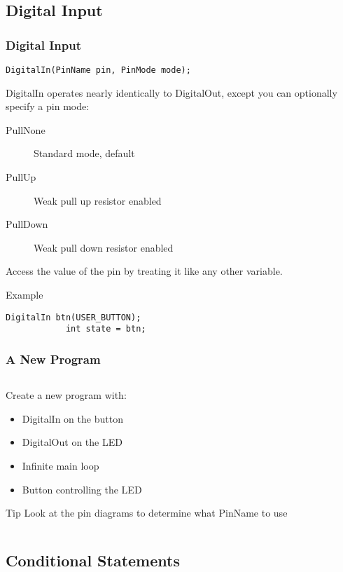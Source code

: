 \subsection{Digital Input}
\label{sub:digital_input}
\begin{frame}[fragile]
	\frametitle{Digital Input}
	\begin{lstlisting}[numbers=none]
		DigitalIn(PinName pin, PinMode mode);
	\end{lstlisting}
	DigitalIn operates nearly identically to DigitalOut, except you can optionally specify a pin mode:
	\begin{description}
		\item[PullNone] Standard mode, default
		\item[PullUp] Weak pull up resistor enabled
		\item[PullDown] Weak pull down resistor enabled
	\end{description}
	Access the value of the pin by treating it like any other variable.
	\begin{block}{Example}
		\begin{lstlisting}[numbers=none]
			DigitalIn btn(USER_BUTTON);
			int state = btn;
		\end{lstlisting}
	\end{block}
\end{frame}

\begin{frame}[fragile]
	\frametitle{A New Program}
	\begin{columns}[T]
		\begin{column}{0.5\textwidth}
			Create a new program with:
			\begin{itemize}
				\item DigitalIn on the button
				\item DigitalOut on the LED
				\item Infinite main loop
				\item Button controlling the LED
			\end{itemize}
			\begin{block}{Tip}
				Look at the pin diagrams to determine what PinName to use
			\end{block}
		\end{column}
		\begin{column}{0.5\textwidth}
			\pause
			
		\end{column}
	\end{columns}
\end{frame}

\subsection{Conditional Statements}
\label{sub:conditional_statements}
